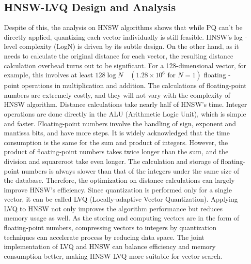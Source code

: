\documentclass[sigconf, nonacm]{acmart}
\begin{document}
\subsection{HNSW-LVQ Design and Analysis }
Despite of this, the analysis on HNSW algorithms shows that while PQ can't be directly applied, quantizing each vector individually is still feasible.  HNSW's log - level complexity (LogN) is driven by its subtle design.  On the other hand, as it needs to calculate the original distance for each vector, the resulting distance calculation overhead turns out to be significant.  For a 128-dimensional vector, for example, this involves at least $128 \log N \quad ( 1.28 \times 10^6 \text{ for } N = 1)$ floating - point operations in multiplication and addition. The calculations of floating-point numbers are extremely costly, and they will not vary with the complexity of HNSW algorithm. Distance calculations take nearly half of HNSW's time.  
Integer operations are done directly in the ALU (Arithmetic Logic Unit), which is simple and faster. Floating-point numbers involve the handling of sign, exponent and mantissa bits, and have more steps. It is widely acknowledged that the time consumption is the same for the sum and product of integers. However, the product of floating-point numbers takes twice longer than the sum, and the division and squareroot take even longer. The calculation and storage of floating-point numbers is always slower than that of the integers under the same size of the database.  Therefore, the optimization on distance calculations can largely improve HNSW’s efficiency.  Since quantization is performed only for a single vector, it can be called LVQ (Locally-adaptive Vector Quantization).
Applying LVQ to HNSW not only improves the algorithm performance but reduces memory usage as well.  As the storing and computing vectors are in the form of floating-point numbers, compressing vectors to integers by quantization techniques can accelerate process by reducing data space.  The joint implementation of LVQ and HNSW can balance efficiency and memory consumption better, making HNSW-LVQ more suitable for vector search.
\end{document}
